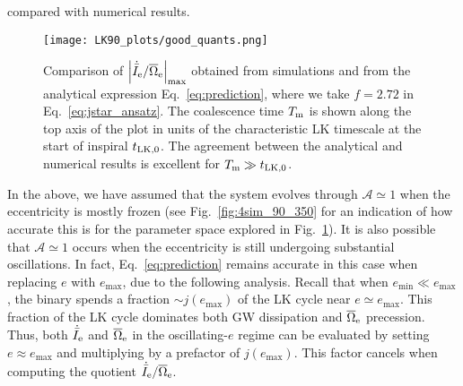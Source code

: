 \documentclass[
        twocolumn,
        twocolappendix
    ]{aastex63}
\newcommand*{\abs}[1]{\left|#1\right|}
\begin{document}
compared with numerical results.
\begin{figure}
    \centering
    \texttt{[image: LK90\_plots/good\_quants.png]}
    \caption{Comparison of $\abs{\dot{\bar{I}}_{\rm e} / \overline{\Omega}_{\rm
    e}}_{\max}$ obtained from simulations and from the analytical expression
    Eq.~\eqref{eq:prediction}, where we take $f = 2.72$ in
    Eq.~\eqref{eq:jstar_ansatz}. The coalescence time $T_{\rm m}$ is shown along
    the top axis of the plot in units of the characteristic LK timescale at the
    start of inspiral $t_{\rm LK, 0}$. The agreement between the analytical and
    numerical results is excellent for $T_{\rm m} \gg t_{\rm
    LK,0}$.}\label{fig:good_quants}
\end{figure}

In the above, we have assumed that the system evolves through $\mathcal{A}
\simeq 1$  when the eccentricity is mostly frozen (see
Fig.~\ref{fig:4sim_90_350} for an indication of how accurate this is for the
parameter space explored in Fig.~\ref{fig:good_quants}). It is also possible
that $\mathcal{A} \simeq 1$ occurs when the eccentricity is still undergoing
substantial oscillations. In fact, Eq.~\eqref{eq:prediction} remains accurate
in this case when replacing $e$ with $e_{\max}$, due to the following
analysis. Recall that when $e_{\min} \ll e_{\max}$, the binary spends a fraction
$\sim j(e_{\max})$ of the LK cycle near $e \simeq e_{\max}$. This fraction of
the LK cycle dominates both GW dissipation and $\overline{\Omega}_{\rm e}$
precession. Thus, both $\dot{\bar{I}}_{\rm e}$ and $\overline{\Omega}_{\rm e}$
in the oscillating-$e$ regime can be evaluated by setting $e \approx e_{\max}$
and multiplying by a prefactor of $j(e_{\max})$. This factor cancels when
computing the quotient $\dot{\bar{I}}_{\rm e} / \overline{\Omega}_{\rm e}$.
\end{document}
